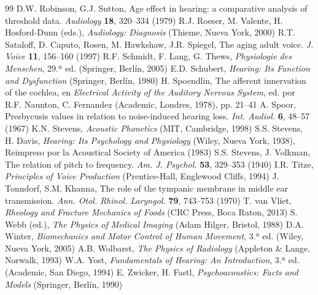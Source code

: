 \documentclass[12pt]{book}
\begin{document}
\begin{thebibliography}{99}
 D.W. Robinson, G.J. Sutton, Age effect in hearing: a comparative analysis of threshold data. \textit{Audiology} \textbf{18}, 320--334 (1979)
 R.J. Roeser, M. Valente, H. Hosford-Dunn (eds.), \textit{Audiology: Diagnosis} (Thieme, Nueva York, 2000)
 R.T. Sataloff, D. Caputo, Rosen, M. Hawkshaw, J.R. Spiegel, The aging adult voice. \textit{J. Voice} \textbf{11}, 156--160 (1997)
 R.F. Schmidt, F. Lang, G. Thews, \textit{Physiologie des Menschen}, 29.ª ed. (Springer, Berlín, 2005)
 E.D. Schubert, \textit{Hearing: Its Function and Dysfunction} (Springer, Berlín, 1980)
 H. Spoendlin, The afferent innervation of the cochlea, en \textit{Electrical Activity of the Auditory Nervous System}, ed. por R.F. Naunton, C. Fernandez (Academic, Londres, 1978), pp. 21--41
 A. Spoor, Presbycusis values in relation to noise-induced hearing loss. \textit{Int. Audiol.} \textbf{6}, 48--57 (1967)
 K.N. Stevens, \textit{Acoustic Phonetics} (MIT, Cambridge, 1998)
 S.S. Stevens, H. Davis, \textit{Hearing: Its Psychology and Physiology} (Wiley, Nueva York, 1938), Reimpreso por la Acoustical Society of America (1983)
 S.S. Stevens, J. Volkman, The relation of pitch to frequency. \textit{Am. J. Psychol.} \textbf{53}, 329--353 (1940)
 I.R. Titze, \textit{Principles of Voice Production} (Prentice-Hall, Englewood Cliffs, 1994)
 J. Tonndorf, S.M. Khanna, The role of the tympanic membrane in middle ear transmission. \textit{Ann. Otol. Rhinol. Laryngol.} \textbf{79}, 743--753 (1970)
 T. van Vliet, \textit{Rheology and Fracture Mechanics of Foods} (CRC Press, Boca Raton, 2013)
 S. Webb (ed.), \textit{The Physics of Medical Imaging} (Adam Hilger, Bristol, 1988)
 D.A. Winter, \textit{Biomechanics and Motor Control of Human Movement}, 3.ª ed. (Wiley, Nueva York, 2005)
 A.B. Wolbarst, \textit{The Physics of Radiology} (Appleton \& Lange, Norwalk, 1993)
 W.A. Yost, \textit{Fundamentals of Hearing: An Introduction}, 3.ª ed. (Academic, San Diego, 1994)
 E. Zwicker, H. Fastl, \textit{Psychoacoustics: Facts and Models} (Springer, Berlín, 1990)
\end{thebibliography}

\end{document}
